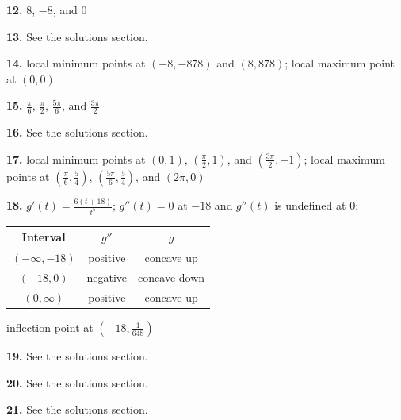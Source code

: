 \documentclass[12pt,]{book}
\theoremstyle{plain}
\theoremstyle{definition}
\numberwithin{equation}{section}
\newcommand{\fe}[2]{#1\mathopen{}\left(#2\right)\mathclose{}}
\newcommand{\ointerval}[2]{\left(#1,#2\right)}
\newcommand{\point}[2]{\left(#1,#2\right)}
\newcommand{\fd}[1]{#1'}
\newcommand{\sd}[1]{#1''}
\begin{document}
                \par\smallskip
\noindent\textbf{12.}\quad{}
                    \(8\), \(-8\), and \(0\)%

                \par\smallskip
\noindent\textbf{13.}\quad{}
                    See the solutions section.%

                \par\smallskip
\noindent\textbf{14.}\quad{}
                    local minimum points at \(\point{-8}{-878}\) and \(\point{8}{878}\); local maximum point at \(\point{0}{0}\)%

                \par\smallskip
\noindent\textbf{15.}\quad{}
                    \(\frac{\pi}{6}\), \(\frac{\pi}{2}\), \(\frac{5\pi}{6}\), and \(\frac{3\pi}{2}\)%

                \par\smallskip
\noindent\textbf{16.}\quad{}
                    See the solutions section.%

                \par\smallskip
\noindent\textbf{17.}\quad{}
                    local minimum points at \(\point{0}{1}\), \(\point{\frac{\pi}{2}}{1}\), and \(\point{\frac{3\pi}{2}}{-1}\); local maximum points at \(\point{\frac{\pi}{6}}{\frac{5}{4}}\), \(\point{\frac{5\pi}{6}}{\frac{5}{4}}\), and \(\point{2\pi}{0}\)%

                \par\smallskip
\noindent\textbf{18.}\quad{}
                \(\fe{\fd{g}}{t}=\frac{6(t+18)}{t^5}\); \(\fe{\sd{g}}{t}=0\) at \(-18\) and \(\fe{\sd{g}}{t}\) is undefined at \(0\);%

                \begin{tabular}{ccc}
\toprule
Interval&\(\sd{g}\)&\(g\)\\
\midrule
\(\ointerval{-\infty}{-18}\)&positive&concave up\\
\midrule
\(\ointerval{-18}{0}\)&negative&concave down\\
\midrule
\(\ointerval{0}{\infty}\)&positive&concave up\\
\bottomrule
\end{tabular}

                \par
inflection point at \(\point{-18}{\frac{1}{648}}\)%

            \par\smallskip
\noindent\textbf{19.}\quad{}
                    See the solutions section.%

                \par\smallskip
\noindent\textbf{20.}\quad{}
                    See the solutions section.%

                \par\smallskip
\noindent\textbf{21.}\quad{}
                    See the solutions section.%

                \par\smallskip
\end{document}
